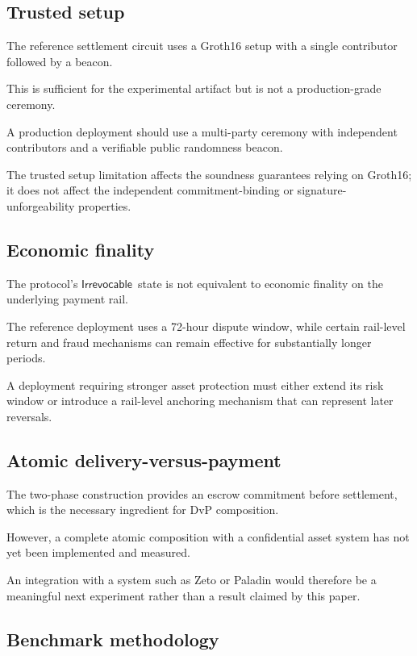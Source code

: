 \documentclass[10pt,twocolumn]{article}
\newcommand{\Irrevocable}{\ensuremath{\mathsf{Irrevocable}}}
\begin{document}
\subsection{Trusted setup}

The reference settlement circuit uses a Groth16 setup with a single
contributor followed by a beacon.

This is sufficient for the experimental artifact but is not a
production-grade ceremony.

A production deployment should use a multi-party ceremony with
independent contributors and a verifiable public randomness beacon.

The trusted setup limitation affects the soundness guarantees relying on
Groth16; it does not affect the independent commitment-binding or
signature-unforgeability properties.

\subsection{Economic finality}

The protocol's \Irrevocable\ state is not equivalent to economic
finality on the underlying payment rail.

The reference deployment uses a 72-hour dispute window, while certain
rail-level return and fraud mechanisms can remain effective for
substantially longer periods.

A deployment requiring stronger asset protection must either extend its
risk window or introduce a rail-level anchoring mechanism that can
represent later reversals.

\subsection{Atomic delivery-versus-payment}

The two-phase construction provides an escrow commitment before
settlement, which is the necessary ingredient for DvP composition.

However, a complete atomic composition with a confidential asset system
has not yet been implemented and measured.

An integration with a system such as Zeto or Paladin would therefore be
a meaningful next experiment rather than a result claimed by this paper.

\subsection{Benchmark methodology}
\end{document}
